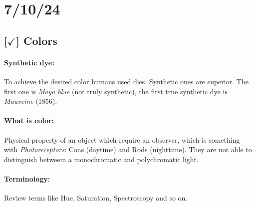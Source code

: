 \section{7/10/24}

\subsection{[$\checkmark$] Colors}

\paragraph{Synthetic dye:} To achieve the desired color humans used dies. Synthetic ones are superior. The first one is \textit{Maya blue} (not truly synthetic), the first true synthetic dye is \textit{Mauveine} (1856).

\paragraph{What is color:} Physical property of an object which require an observer, which is something with \textit{Photoreceptors}: Cons (daytime) and Rods (nighttime). They are not able to distinguish betweem a monochromatic and polychromatic light.

\paragraph{Terminology:} Review terms like Hue, Saturation, Spectroscopy and so on.
